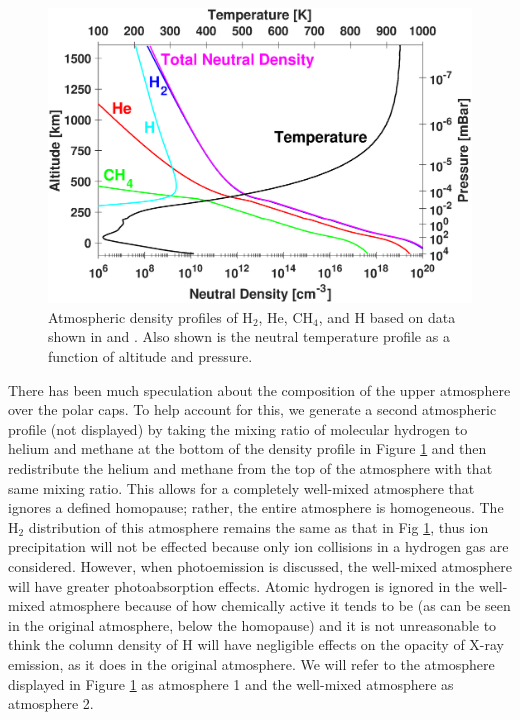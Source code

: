\documentclass[draft]{agujournal2018}
\begin{document}
\begin{figure}[ht]
\centering
\includegraphics[width=\textwidth]{Figures/Atmosphere.eps}
\caption{Atmospheric density profiles of H$_{2}$, He, CH$_{4}$, and H based on data shown in \citet{maurellis2001} and \citet{sinclair2018}. Also shown is the neutral temperature profile as a function of altitude and pressure.}
\label{fig:atm}
\end{figure}

There has been much speculation about the composition of the upper atmosphere over the polar caps.
To help account for this, we generate a second atmospheric profile (not displayed) by taking the mixing ratio of molecular hydrogen to helium and methane at the bottom of the density profile in Figure \ref{fig:atm} and then redistribute the helium and methane from the top of the atmosphere with that same mixing ratio.
This allows for a completely well-mixed atmosphere that ignores a defined homopause; rather, the entire atmosphere is homogeneous.
The H$_{2}$ distribution of this atmosphere remains the same as that in Fig \ref{fig:atm}, thus ion precipitation will not be effected because only ion collisions in a hydrogen gas are considered.
However, when photoemission is discussed, the well-mixed atmosphere will have greater photoabsorption effects.
Atomic hydrogen is ignored in the well-mixed atmosphere because of how chemically active it tends to be (as can be seen in the original atmosphere, below the homopause) and it is not unreasonable to think the column density of H will have negligible effects on the opacity of X-ray emission, as it does in the original atmosphere.
We will refer to the atmosphere displayed in Figure \ref{fig:atm} as atmosphere 1 and the well-mixed atmosphere as atmosphere 2.
\end{document}
